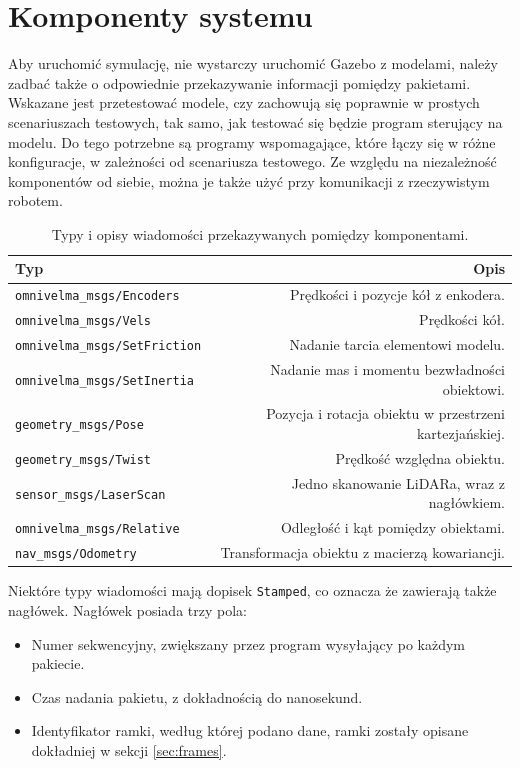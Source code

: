 \chapter{Komponenty systemu}
\label{sec:components}
Aby uruchomić symulację, nie wystarczy uruchomić Gazebo z modelami, należy zadbać także o odpowiednie przekazywanie informacji pomiędzy pakietami.
Wskazane jest przetestować modele, czy zachowują się poprawnie w prostych scenariuszach testowych, tak samo, jak testować się będzie program sterujący na modelu.
Do tego potrzebne są programy wspomagające, które łączy się w różne konfiguracje, w zależności od scenariusza testowego.
Ze względu na niezależność komponentów od siebie, można je także użyć przy komunikacji z rzeczywistym robotem.

\begin{table}
	\centering
	\begin{tabular}{l r}
		Typ & Opis \\
		\hline
		\texttt{omnivelma\_msgs/Encoders} & Prędkości i pozycje kół z enkodera. \\
		\texttt{omnivelma\_msgs/Vels} & Prędkości kół. \\
		\texttt{omnivelma\_msgs/SetFriction} & Nadanie tarcia elementowi modelu. \\
		\texttt{omnivelma\_msgs/SetInertia} & Nadanie mas i momentu bezwładności obiektowi. \\
		\texttt{geometry\_msgs/Pose} & Pozycja i rotacja obiektu w przestrzeni kartezjańskiej. \\
		\texttt{geometry\_msgs/Twist} & Prędkość względna obiektu. \\
		\texttt{sensor\_msgs/LaserScan} & Jedno skanowanie LiDARa, wraz z nagłówkiem. \\
		\texttt{omnivelma\_msgs/Relative} & Odległość i kąt pomiędzy obiektami. \\
		\texttt{nav\_msgs/Odometry} & Transformacja obiektu z macierzą kowariancji. \\
	\end{tabular}
	\caption{Typy i opisy wiadomości przekazywanych pomiędzy komponentami.}
	\label{tab:messages}
\end{table}

Niektóre typy wiadomości mają dopisek \texttt{Stamped}, co oznacza że zawierają także nagłówek.
Nagłówek posiada trzy pola:
\begin{itemize}
	\item Numer sekwencyjny, zwiększany przez program wysyłający po każdym pakiecie.
	\item Czas nadania pakietu, z dokładnością do nanosekund.
	\item Identyfikator ramki, według której podano dane, ramki zostały opisane dokładniej w sekcji \ref{sec:frames}.
\end{itemize}

